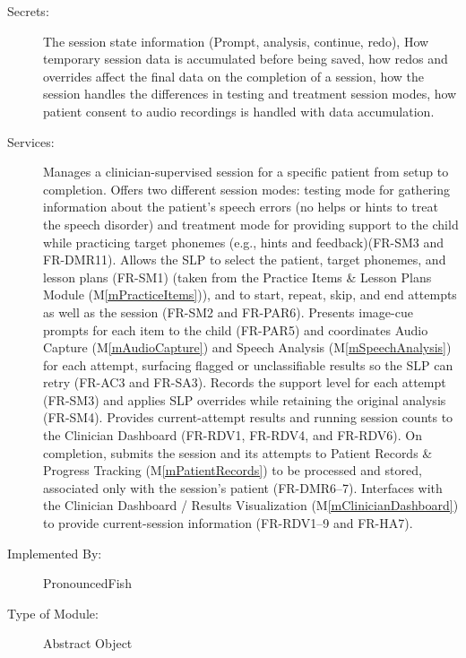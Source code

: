 \documentclass[12pt, titlepage]{article}
\newcommand{\mref}[1]{M\ref{#1}}
\begin{document}
\begin{description}
\item[Secrets:] The session state information (Prompt, analysis, continue, redo), 
How temporary session data is accumulated before being saved, 
how redos and overrides affect the final data on the completion of a session,
how the session handles the differences in testing and treatment session modes,
how patient consent to audio recordings is handled with data accumulation.
\item[Services:] Manages a clinician-supervised session for a specific patient from setup to completion. 
Offers two different session modes: testing mode for gathering information about the patient’s speech errors (no helps or hints to treat the speech disorder) and treatment mode for providing support to the child while practicing target phonemes (e.g., hints and feedback)(FR-SM3 and FR-DMR11).
Allows the SLP to select the patient, target phonemes, and lesson plans (FR-SM1) (taken from the Practice Items \& Lesson Plans Module (\mref{mPracticeItems})), and to start, repeat, skip, and end attempts as well as the session (FR-SM2 and FR-PAR6). 
Presents image-cue prompts for each item to the child (FR-PAR5) and coordinates Audio Capture (\mref{mAudioCapture}) and Speech Analysis (\mref{mSpeechAnalysis}) for each attempt, surfacing flagged or unclassifiable results so the SLP can retry (FR-AC3 and FR-SA3). 
Records the support level for each attempt (FR-SM3) and applies SLP overrides while retaining the original analysis (FR-SM4). 
Provides current-attempt results and running session counts to the Clinician Dashboard (FR-RDV1, FR-RDV4, and FR-RDV6).
On completion, submits the session and its attempts to Patient Records \& Progress Tracking (\mref{mPatientRecords}) to be processed and stored, associated only with the session’s patient (FR-DMR6--7). 
Interfaces with the Clinician Dashboard / Results Visualization (\mref{mClinicianDashboard}) to provide current-session information (FR-RDV1--9 and FR-HA7).
\item[Implemented By:] PronouncedFish
\item[Type of Module:] Abstract Object
\end{description}
\end{document}
